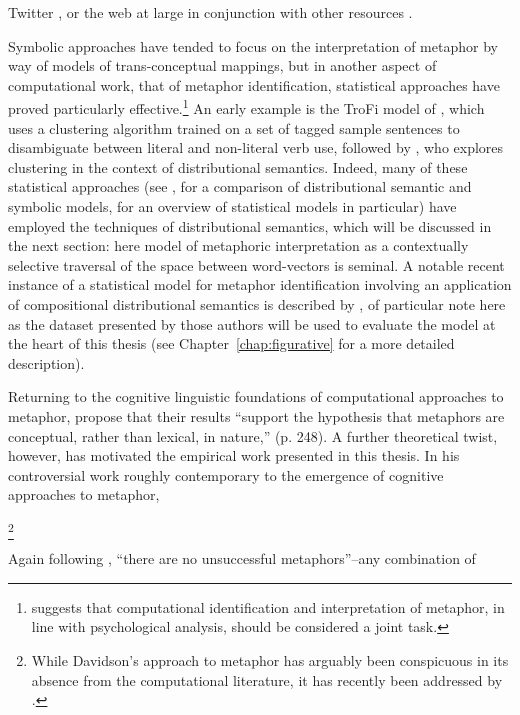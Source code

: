 Twitter \citep{VealeEA2015}, or the web at large in conjunction with other resources \citep{VealeEA2007}.

Symbolic approaches have tended to focus on the interpretation of metaphor by way of models of trans-conceptual mappings, but in another aspect of computational work, that of metaphor identification, statistical approaches have proved particularly effective.\footnote{\cite{Shutova2013} suggests that computational identification and interpretation of metaphor, in line with psychological analysis, should be considered a joint task.}  An early example is the TroFi model of \cite{BirkeEA2006}, which uses a clustering algorithm trained on a set of tagged sample sentences to disambiguate between literal and non-literal verb use, followed by \cite{Utsumi2011}, who explores clustering in the context of distributional semantics.  Indeed, many of these statistical approaches (see \citealt{TurneyEA2011}, \citealt{Dunn2013} for a comparison of distributional semantic and symbolic models, \citealt{ShutovaEA2013} for an overview of statistical models in particular) have employed the techniques of distributional semantics, which will be discussed in the next section: here  model of metaphoric interpretation as a contextually selective traversal of the space between word-vectors is seminal.  A notable recent instance of a statistical model for metaphor identification involving an application of compositional distributional semantics is described by \cite{GutierrezEA2016}, of particular note here as the dataset presented by those authors will be used to evaluate the model at the heart of this thesis (see Chapter~\ref{chap:figurative} for a more detailed description).

Returning to the cognitive linguistic foundations of computational approaches to metaphor, \cite{TsvetkovEA2014} propose that their results ``support the hypothesis that metaphors are conceptual, rather than lexical, in nature,'' (p. 248).  A further theoretical twist, however, has motivated the empirical work presented in this thesis.  In his controversial work roughly contemporary to the emergence of cognitive approaches to metaphor, \cite{Davidson1974}

\footnote{While Davidson's approach to metaphor has arguably been conspicuous in its absence from the computational literature, it has recently been addressed by \cite{Veale2016}.}

Again following \cite{Davidson}, ``there are no unsuccessful metaphors''--any combination of 

